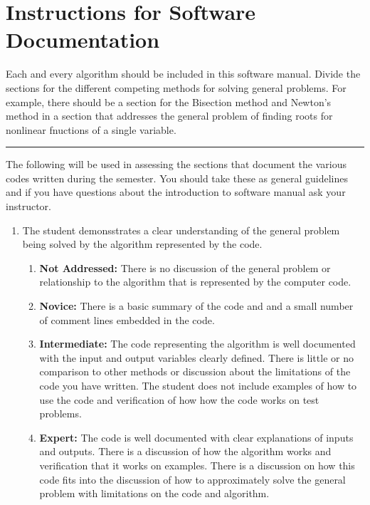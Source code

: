 
\section{\bf Instructions for Software Documentation}

Each and every algorithm should be included in this software manual. Divide the
sections for the different competing methods for solving general problems. For
example, there should be a section for the Bisection method and Newton's method
in a section that addresses the general problem of finding roots for nonlinear
fnuctions of a single variable.

\vskip0.25in\hrule\vskip0.25in


The following will be used in assessing the sections that document the various
codes written during the semester. You should take these as general guidelines
and if you have questions about the introduction to software manual ask your
instructor.

\begin{enumerate}
  \item The student demonsstrates a clear understanding of the general problem
        being solved by the algorithm represented by the code.
    \begin{enumerate}
      \item {\bf Not Addressed:} There is no discussion of the general problem
            or relationship to the algorithm that is represented by the computer
            code.
      \item {\bf Novice:}  There is a basic summary of the code and and a small
            number of comment lines embedded in the code.
      \item {\bf Intermediate:} The code representing the algorithm is well
            documented with the input and output variables clearly defined.
            There is little or no comparison to other methods or discussion
            about the limitations of the code you have written. The student does
            not include examples of how to use the code and verification of how
            how the code works on test problems.
      \item {\bf Expert:} The code is well documented with clear explanations of
            inputs and outputs. There is a discussion of how the algorithm works
            and verification that it works on examples. There is a discussion
            on how this code fits into the discussion of how to approximately
            solve the general problem with limitations on the code and
            algorithm.
    \end{enumerate}
\end{enumerate}

